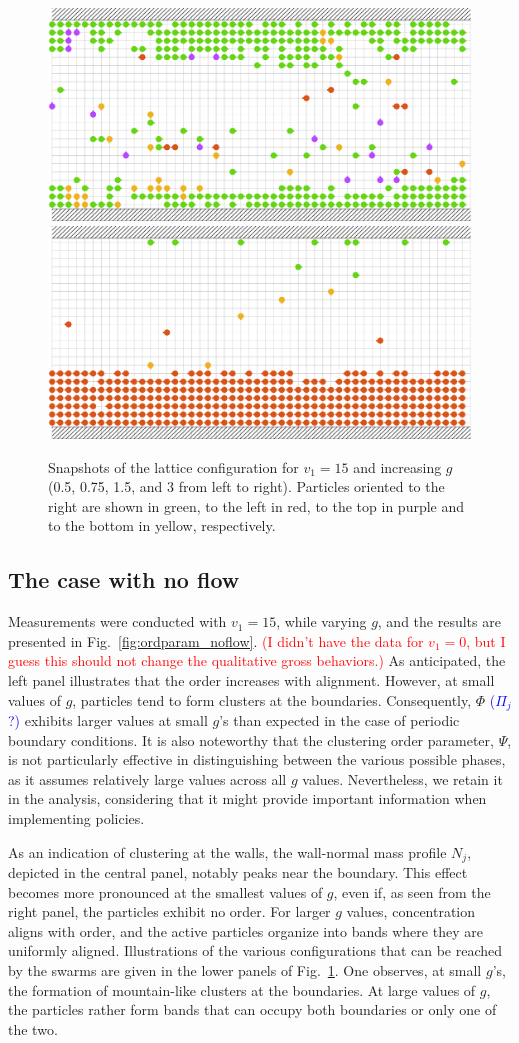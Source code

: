 \documentclass[aps,prl,twocolumn,amsmath,amssymb,superscriptaddress]{revtex4-1}
\newcommand{\obs}[1]{\textcolor{red}{#1}}
\newcommand{\CC}[1]
{\textcolor{blue}{#1}}
\begin{document}
\begin{figure}[t!]
   \includegraphics[width=.25\textwidth]{snap_g1.5_v1_15_t2e6}
   \includegraphics[width=.25\textwidth]{snap_g3_v1_15_t2e6}
   \caption{\label{fig:snapshots} Snapshots of the lattice configuration for $v_1=15$ and increasing $g$ (0.5, 0.75, 1.5, and 3 from left to right). Particles oriented to the right are shown in green, to the left in red, to the top in purple and to the bottom in yellow, respectively.}
\end{figure}

\subsection{The case with no flow}
Measurements were conducted with $v_1=15$, while varying $g$, and the results are presented in Fig.~\ref{fig:ordparam_noflow}. \obs{(I didn't have the data for $v_1=0$, but I guess this should not change the qualitative gross behaviors.)} As anticipated, the left panel illustrates that the order increases with alignment. However, at small values of $g$, particles tend to form clusters at the boundaries. Consequently, $\Phi$ \CC{($\Pi_j$ ?)} exhibits larger values at small $g$'s than expected in the case of periodic boundary conditions. It is also noteworthy that the clustering order parameter, $\Psi$, is not particularly effective in distinguishing between the various possible phases, as it assumes relatively large values across all $g$ values. Nevertheless, we retain it in the analysis, considering that it might provide important information when implementing policies.

As an indication of clustering at the walls, the wall-normal mass profile $N_j$, depicted in the central panel, notably peaks near the boundary. This effect becomes more pronounced at the smallest values of $g$, even if, as seen from the right panel, the particles exhibit no order. For larger $g$ values, concentration aligns with order, and the active particles organize into bands where they are uniformly aligned. Illustrations of the various configurations that can be reached by the swarms are given in the lower panels of Fig.~\ref{fig:snapshots}. One observes, at small $g$'s, the formation of mountain-like clusters at the boundaries. At large values of $g$, the particles rather form bands that can occupy both boundaries or only one of the two.
\end{document}
